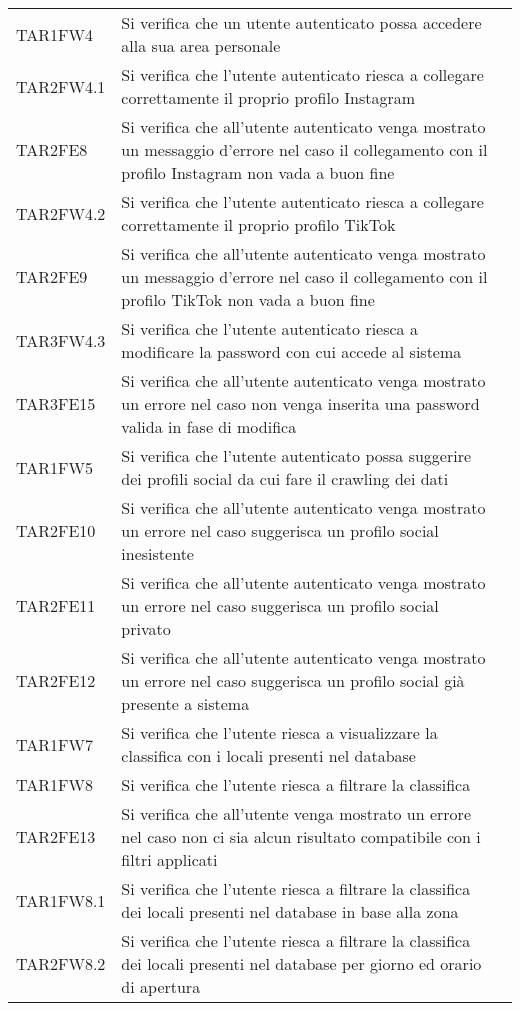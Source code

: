 \begin{longtable}{ m{}<{\centering}  m{}<{\centering}  m{}<{\centering} }
	TAR1FW4 & Si verifica che un utente autenticato possa accedere alla sua area personale & \Ni \\
	TAR2FW4.1 & Si verifica che l'utente autenticato riesca a collegare correttamente il proprio profilo Instagram & \Ni \\
	TAR2FE8 & Si verifica che all'utente autenticato venga mostrato un messaggio d'errore nel caso il collegamento con il profilo Instagram non vada a buon fine & \Ni \\
	TAR2FW4.2 & Si verifica che l'utente autenticato riesca a collegare correttamente il proprio profilo TikTok & \Ni \\
	TAR2FE9 & Si verifica che all'utente autenticato venga mostrato un messaggio d'errore nel caso il collegamento con il profilo TikTok non vada a buon fine & \Ni \\
	TAR3FW4.3 & Si verifica che l'utente autenticato riesca a modificare la password con cui accede al sistema & \Ni \\
	TAR3FE15 & Si verifica che all'utente autenticato venga mostrato un errore nel caso non venga inserita una password valida in fase di modifica & \Ni \\
	TAR1FW5 & Si verifica che l'utente autenticato possa suggerire dei profili social da cui fare il crawling dei dati & \Ni \\
	TAR2FE10 & Si verifica che all'utente autenticato venga mostrato un errore nel caso suggerisca un profilo social inesistente & \Ni \\
	TAR2FE11 & Si verifica che all'utente autenticato venga mostrato un errore nel caso suggerisca un profilo social privato & \Ni \\
	TAR2FE12 & Si verifica che all'utente autenticato venga mostrato un errore nel caso suggerisca un profilo social già  presente a sistema & \Ni \\
	TAR1FW7 & Si verifica che l'utente riesca a visualizzare la classifica con i locali presenti nel database & \Ni \\
	TAR1FW8 & Si verifica che l'utente riesca a filtrare la classifica & \Ni \\
	TAR2FE13 & Si verifica che all'utente venga mostrato un errore nel caso non ci sia alcun risultato compatibile con i filtri applicati & \Ni \\
	TAR1FW8.1 & Si verifica che l'utente riesca a filtrare la classifica dei locali presenti nel database in base alla zona & \Ni \\
	TAR2FW8.2 & Si verifica che l'utente riesca a filtrare la classifica dei locali presenti nel database per giorno ed orario di apertura & \Ni \\

\end{longtable}
